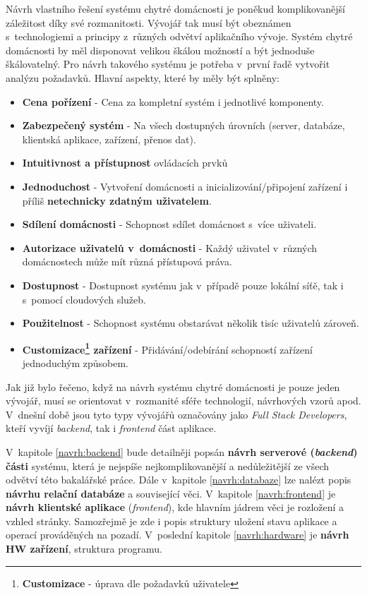 Návrh vlastního řešení systému chytré domácnosti je poněkud komplikovanější záležitost díky své rozmanitosti.
Vývojář tak musí být obeznámen s~technologiemi a principy z~různých odvětví aplikačního vývoje.
Systém chytré domácnosti by měl disponovat velikou škálou možností a být jednoduše škálovatelný.
Pro návrh takového systému je potřeba v~první řadě vytvořit analýzu požadavků.
\newline
\newline
Hlavní aspekty, které by měly být splněny:
\begin{itemize}
  \item \textbf{Cena pořízení} - Cena za kompletní systém i jednotlivé komponenty.
  \item \textbf{Zabezpečený systém} - Na všech dostupných úrovních (server, databáze, klientská aplikace, zařízení, přenos dat).
  \item \textbf{Intuitivnost a přístupnost} ovládacích prvků
  \item \textbf{Jednoduchost} - Vytvoření domácnosti a inicializování/připojení zařízení i příliš \textbf{netechnicky zdatným uživatelem}.
  \item \textbf{Sdílení domácnosti} - Schopnost sdílet domácnost s~více uživateli.
  \item \textbf{Autorizace uživatelů v~domácnosti} - Každý uživatel v~různých domácnostech může mít různá přístupová práva.
  \item \textbf{Dostupnost} - Dostupnost systému jak v~případě pouze lokální síťě, tak i s~pomocí cloudových služeb.
  \item \textbf{Použitelnost} - Schopnost systému obstarávat několik tisíc uživatelů zároveň.
  \item \textbf{Customizace\footnote{\textbf{Customizace} - úprava dle požadavků uživatele} zařízení} - Přidávání/odebírání schopností zařízení jednoduchým způsobem.
\end{itemize}
Jak již bylo řečeno, když na návrh systému chytré domácnosti je pouze jeden vývojář, musí se orientovat v~rozmanité sféře technologií, návrhových vzorů apod.
V~dnešní době jsou tyto typy vývojářů označovány jako \emph{Full Stack Developers}, kteří vyvíjí \emph{backend}, tak i \emph{frontend} část aplikace.

V~kapitole \ref{navrh:backend} bude detailněji popsán \textbf{návrh serverové (\emph{backend}) části} systému, která je nejspíše nejkomplikovanější a nedůležitější ze všech odvětví této bakalářské práce.
Dále v~kapitole \ref{navrh:databaze} lze nalézt popis \textbf{návrhu relační databáze} a související věci.
V~kapitole \ref{navrh:frontend} je \textbf{návrh klientské aplikace} (\emph{frontend}), kde hlavním jádrem věci je rozložení a vzhled stránky.
Samozřejmě je zde i popis struktury uložení stavu aplikace a operací prováděných na pozadí.
V~poslední kapitole \ref{navrh:hardware} je \textbf{návrh HW zařízení}, struktura programu.
\newpage


